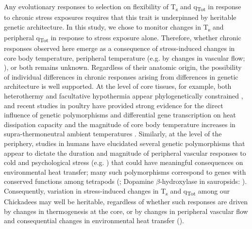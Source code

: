 \documentclass[12pt]{article}
\begin{document}
\noindent Any evolutionary responses to selection on flexibility of T\textsubscript{s} and q\textsubscript{Tot} in response to chronic stress exposures requires that this trait is underpinned by heritable genetic architecture. In this study, we chose to monitor changes in T\textsubscript{s} and peripheral q\textsubscript{Tot} in response to stress exposure alone. Therefore, whether chronic responses observed here emerge as a consequence of stress-induced changes in core body temperature, peripheral temperature (e.g. by changes in vascular flow; \citealt{oka_2001}), or both remains unknown. Regardless of their anatomic origin, the possibility of individual differences in chronic responses arising from differences in genetic architecture is well supported. At the level of core tissues, for example, both heterothermy and facultative hypothermia appear phylogenetically constrained \citep{boyles_2013,gerson_2019}, and recent studies in poultry have provided strong evidence for the direct influence of genetic polymorphisms and differential gene transcription on heat dissipation capacity and the magnitude of core body temperature increases in supra-thermoneutral ambient temperatures \citep{srikanth_2019,zhuang_2019}. Similarly, at the level of the periphery, studies in humans have elucidated several genetic polymorphisms that appear to dictate the duration and magnitude of peripheral vascular responses to cold and psychological stress (e.g. \citealt{rao_2008,chen_2010,kelsey_2010,kelsey_2012,huang_2012}) that could have meaningful consequences on environmental heat transfer; many such polymorphisms correspond to genes with conserved functions among tetrapods (\citealt{vincent_1998,yamamoto_2011,cespedes_2017}; Dopamine $\beta$-hydroxylase in sauropsids: \citealt{lovell_2015}). Consequently, variation in stress-induced changes in T\textsubscript{s} and q\textsubscript{Tot} among our Chickadees may well be heritable, regardless of whether such responses are driven by changes in thermogenesis at the core, or by changes in peripheral vascular flow and consequential changes in environmental heat transfer (\citealt{robertson_2020a}). \vspace{1cm}
\end{document}
